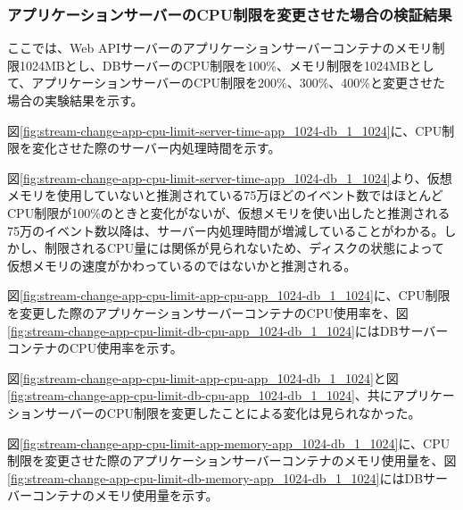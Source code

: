 \documentclass[../../../../main]{subfiles}
\begin{document}
    \subsubsection{アプリケーションサーバーのCPU制限を変更させた場合の検証結果}\label{subsubsec:result-streaming-change-app-cpu}

    ここでは、Web APIサーバーのアプリケーションサーバーコンテナのメモリ制限1024MBとし、DBサーバーのCPU制限を100\%、メモリ制限を1024MBとして、アプリケーションサーバーのCPU制限を200\%、300\%、400\%と変更させた場合の実験結果を示す。


    図\ref{fig:stream-change-app-cpu-limit-server-time-app_1024-db_1_1024}に、CPU制限を変化させた際のサーバー内処理時間を示す。

    

    図\ref{fig:stream-change-app-cpu-limit-server-time-app_1024-db_1_1024}より、仮想メモリを使用していないと推測されている75万ほどのイベント数ではほとんどCPU制限が100\%のときと変化がないが、仮想メモリを使い出したと推測される75万のイベント数以降は、サーバー内処理時間が増減していることがわかる。しかし、制限されるCPU量には関係が見られないため、ディスクの状態によって仮想メモリの速度がかわっているのではないかと推測される。


    図\ref{fig:stream-change-app-cpu-limit-app-cpu-app_1024-db_1_1024}に、CPU制限を変更した際のアプリケーションサーバーコンテナのCPU使用率を、図\ref{fig:stream-change-app-cpu-limit-db-cpu-app_1024-db_1_1024}にはDBサーバーコンテナのCPU使用率を示す。

    

    

    図\ref{fig:stream-change-app-cpu-limit-app-cpu-app_1024-db_1_1024}と図\ref{fig:stream-change-app-cpu-limit-db-cpu-app_1024-db_1_1024}、共にアプリケーションサーバーのCPU制限を変更したことによる変化は見られなかった。


    図\ref{fig:stream-change-app-cpu-limit-app-memory-app_1024-db_1_1024}に、CPU制限を変更させた際のアプリケーションサーバーコンテナのメモリ使用量を、図\ref{fig:stream-change-app-cpu-limit-db-memory-app_1024-db_1_1024}にはDBサーバーコンテナのメモリ使用量を示す。
\end{document}
